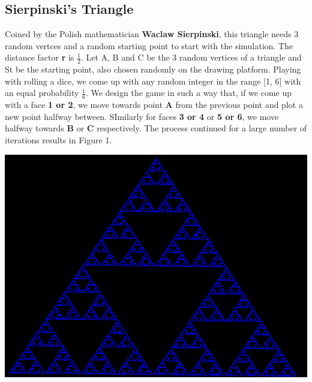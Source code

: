 \documentclass[a0,portrait]{a0poster}
\begin{document}
\begin{multicols}{3}
\section*{Sierpinski's Triangle}
Coined by the Polish mathematician \textbf{Waclaw Sierpinski}, this triangle needs 3 random vertces and a random starting point to start with the simulation. The distance factor \textbf{r} is $\frac{1}{2}$. Let A, B and C be the 3 random vertices of a triangle and St be the starting point,  also chosen randomly on the drawing platform. Playing with rolling a dice, we come up with any random integer in the range [1, 6] with an equal probability $\frac{1}{6}$. We design the game in such a way that, if we come up with a face \textbf{1 or 2}, we move towards point \textbf{A} from the previous point and plot a new point halfway between. SImilarly for faces \textbf{3 or 4} or \textbf{5 or 6}, we move halfway towards \textbf{B} or \textbf{C} respectively. The process continued for a large number of iterations results in Figure 1.
\begin{center}\vspace{0.5cm}
\includegraphics[width=0.6\linewidth]{sier}
\end{center}%

\end{multicols}
\end{document}
